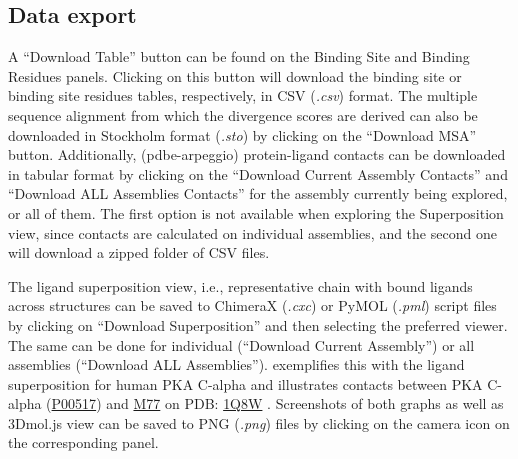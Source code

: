 \subsection{Data export}

A ``Download Table'' button can be found on the Binding Site and Binding Residues panels. Clicking on this button will download the binding site or binding site residues tables, respectively, in CSV (\textit{.csv}) format. The multiple sequence alignment from which the divergence scores are derived can also be downloaded in Stockholm format (\textit{.sto}) by clicking on the ``Download MSA'' button. Additionally, (pdbe-arpeggio) protein-ligand contacts can be downloaded in tabular format by clicking on the ``Download Current Assembly Contacts'' and ``Download ALL Assemblies Contacts'' for the assembly currently being explored, or all of them. The first option is not available when exploring the Superposition view, since contacts are calculated on individual assemblies, and the second one will download a zipped folder of CSV files.

The ligand superposition view, i.e., representative chain with bound ligands across structures can be saved to ChimeraX (\textit{.cxc}) or PyMOL (\textit{.pml}) script files by clicking on ``Download Superposition'' and then selecting the preferred viewer. The same can be done for individual (``Download Current Assembly'') or all assemblies (``Download ALL Assemblies'').  exemplifies this with the ligand superposition for human PKA C-alpha and  illustrates contacts between PKA C-alpha (\href{https://www.uniprot.org/uniprotkb/P00517/entry}{P00517}) and \href{https://www.ebi.ac.uk/pdbe-srv/pdbechem/chemicalCompound/show/M77}{M77} on PDB: \href{https://www.ebi.ac.uk/pdbe/entry/pdb/1q8w}{1Q8W} \cite{BREITENLECHNER_2003_PKA}. Screenshots of both graphs as well as 3Dmol.js view can be saved to PNG (\textit{.png}) files by clicking on the camera icon on the corresponding panel.


